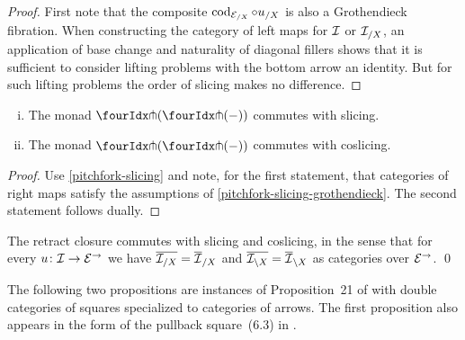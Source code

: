 \documentclass[reqno,10pt,a4paper,oneside,draft]{amsart}
\begin{document}
{{\begin{proof}
First note that the composite $\cod_{\cal{E}_{/X}} \cc u_{/X}$ is also a Grothendieck fibration.
When constructing the category of left maps for $\cal{I}$ or $\cal{I}_{/X}$, an application of base change and naturality of diagonal fillers shows that it is sufficient to consider lifting problems with the bottom arrow an identity.
But for such lifting problems the order of slicing makes no difference.
\end{proof}

\begin{corollary} \label{pitchfork-slicing-monad} \leavevmode
\begin{enumerate}[(i)]
\item The monad $\liftl{(\liftr{(-)})}$ commutes with slicing.
\item The monad $\liftr{(\liftl{(-)})}$ commutes with coslicing.
\end{enumerate}
\end{corollary}

\begin{proof}
Use \cref{pitchfork-slicing} and note, for the first statement, that categories of right maps satisfy the assumptions of \cref{pitchfork-slicing-grothendieck}.
The second statement follows dually.
\end{proof}

\begin{proposition}
The retract closure commutes with slicing and coslicing, in the sense that for every $u \co \cal{I} \to \catE^\to$ we have $\overline{\cal{I}_{/X}} = \overline{\cal{I}}_{/X}$ and $\overline{\cal{I}_{\backslash X}} = \overline{\cal{I}}_{\backslash X}$ as categories over $\catE^\to$.
\qed
\end{proposition}

The following two propositions are instances of Proposition~21 of \cite{bourke-garner-I} with double categories of squares specialized to categories of arrows.
The first proposition also appears in the form of the pullback square~(6.3) in \cite{riehl-monoidal-ams}.

}}
\end{document}
